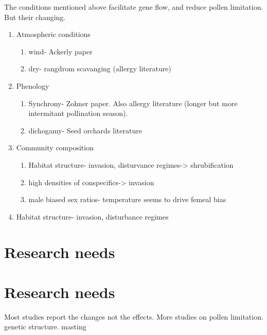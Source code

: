 \documentclass[11pt]{article}
\begin{document}
The conditions mentioned above facilitate gene flow, and reduce pollen limitation. But their changing.
\begin{enumerate}
\item Atmospheric conditions
  \begin{enumerate}
  \item wind- Ackerly paper
  \item dry- rangdrom scavanging (allergy literature)
  \end{enumerate}
\item Phenology
  \begin{enumerate}
  \item Synchrony- Zohner paper. Also allergy literature (longer but more intermitant pollination season).
  \item dichogamy- Seed orchards literature
  \end{enumerate}
\item Community composition
  \begin{enumerate}
  \item Habitat structure- invasion, disturvance regimes-> shrubification
  \item high densities of conspecifics-> invasion
  \item male biased sex ratios- temperature seems to drive femeal bias
  \end{enumerate}
\item Habitat structure- invasion, disturbance regimes
 
\end{enumerate}
\section{Research needs}

\section{Research needs}
Most studies report the changes not the effects. More studies on pollen limitation. genetic structure. masting







\end{document}
